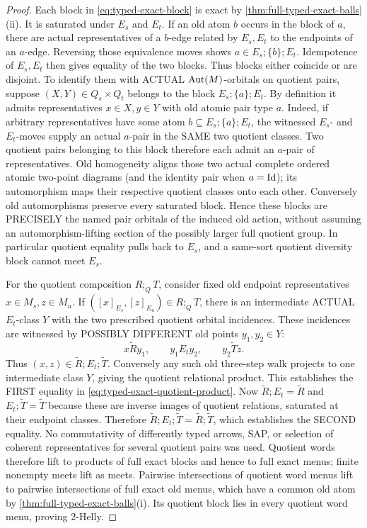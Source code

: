 \begin{proof}
Each block in \eqref{eq:typed-exact-block} is exact by
\cref{thm:full-typed-exact-balls}(ii).  It is saturated under
$E_s$ and $E_t$.  If an old atom $b$ occurs in the block of $a$,
there are actual representatives of a $b$-edge related by
$E_s,E_t$ to the endpoints of an $a$-edge.  Reversing those
equivalence moves shows $a\in E_s;\{b\};E_t$.  Idempotence
of $E_s,E_t$ then gives equality of the two blocks.  Thus blocks either coincide or are disjoint.
To identify them with ACTUAL \(\operatorname{Aut}(M)\)-orbitals
on quotient pairs, suppose
\((X,Y)\in Q_s\times Q_t\) belongs to the
block \(E_s;\{a\};E_t\). By definition
it admits representatives \(x\in X,y\in Y\)
with old atomic pair type \(a\).
Indeed, if arbitrary representatives have
some atom \(b\subseteq E_s;\{a\};E_t\),
the witnessed \(E_s\)- and \(E_t\)-moves
supply an actual \(a\)-pair in the SAME
two quotient classes. Two quotient pairs
belonging to this block therefore each
admit an \(a\)-pair of representatives.
Old homogeneity aligns those two actual
complete ordered atomic two-point diagrams
(and the identity pair when \(a=\mathrm{Id}\));
its automorphism maps their respective
quotient classes onto each other.
Conversely old automorphisms preserve
every saturated block. Hence these blocks
are PRECISELY the named pair orbitals of
the induced old action, without assuming
an automorphism-lifting section of the
possibly larger full quotient group.
In particular quotient equality pulls back
to \(E_s\), and a same-sort quotient
diversity block cannot meet \(E_s\).

For the quotient composition \(R;_Q T\),
consider fixed old endpoint representatives
\(x\in M_s,z\in M_u\).
If \(([x]_{E_s},[z]_{E_u})\in R;_Q T\),
there is an intermediate ACTUAL \(E_t\)-class
\(Y\) with the two prescribed quotient orbital
incidences. These incidences are witnessed by
POSSIBLY DIFFERENT old points \(y_1,y_2\in Y\):
\[
    x\widetilde R y_1,\qquad
    y_1 E_t y_2,\qquad
    y_2\widetilde T z.
\]
Thus \((x,z)\in\widetilde R;E_t;\widetilde T\).
Conversely any such old three-step walk projects
to one intermediate class \(Y\), giving the
quotient relational product. This establishes
the FIRST equality in
\eqref{eq:typed-exact-quotient-product}.
Now \(\widetilde R;E_t=\widetilde R\)
and \(E_t;\widetilde T=\widetilde T\)
because these are inverse images of quotient
relations, saturated at their endpoint classes.
Therefore
\(\widetilde R;E_t;\widetilde T
=\widetilde R;\widetilde T\),
which establishes the SECOND equality.
No commutativity of differently typed arrows,
SAP, or selection of coherent representatives
for several quotient pairs was used.  Quotient words therefore lift to
products of full exact blocks and hence to full exact menus;
finite nonempty meets lift as meets.  Pairwise intersections of
quotient word menus lift to pairwise intersections of full exact
old menus, which have a common old atom by
\cref{thm:full-typed-exact-balls}(i).  Its quotient block lies in
every quotient word menu, proving $2$-Helly.
\end{proof}

